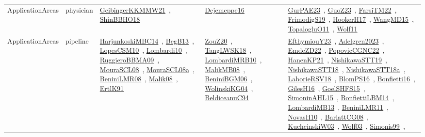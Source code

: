 {\begin{longtable}{lp{3cm}>{\raggedright\arraybackslash}p{6cm}>{\raggedright\arraybackslash}p{6cm}>{\raggedright\arraybackslash}p{8cm}}
ApplicationAreas & physician & \href{works/GeibingerKKMMW21.pdf}{GeibingerKKMMW21}~\cite{GeibingerKKMMW21}, \href{works/ShinBBHO18.pdf}{ShinBBHO18}~\cite{ShinBBHO18} & \href{works/Dejemeppe16.pdf}{Dejemeppe16}~\cite{Dejemeppe16} & \href{works/GurPAE23.pdf}{GurPAE23}~\cite{GurPAE23}, \href{works/GuoZ23.pdf}{GuoZ23}~\cite{GuoZ23}, \href{works/FarsiTM22.pdf}{FarsiTM22}~\cite{FarsiTM22}, \href{works/FrimodigS19.pdf}{FrimodigS19}~\cite{FrimodigS19}, \href{works/HookerH17.pdf}{HookerH17}~\cite{HookerH17}, \href{works/WangMD15.pdf}{WangMD15}~\cite{WangMD15}, \href{works/TopalogluO11.pdf}{TopalogluO11}~\cite{TopalogluO11}, \href{works/Wolf11.pdf}{Wolf11}~\cite{Wolf11}\\
ApplicationAreas & pipeline & \href{works/HarjunkoskiMBC14.pdf}{HarjunkoskiMBC14}~\cite{HarjunkoskiMBC14}, \href{works/BegB13.pdf}{BegB13}~\cite{BegB13}, \href{works/LopesCSM10.pdf}{LopesCSM10}~\cite{LopesCSM10}, \href{works/Lombardi10.pdf}{Lombardi10}~\cite{Lombardi10}, \href{works/RuggieroBBMA09.pdf}{RuggieroBBMA09}~\cite{RuggieroBBMA09}, \href{works/MouraSCL08.pdf}{MouraSCL08}~\cite{MouraSCL08}, \href{works/MouraSCL08a.pdf}{MouraSCL08a}~\cite{MouraSCL08a}, \href{works/BeniniLMR08.pdf}{BeniniLMR08}~\cite{BeniniLMR08}, \href{works/Malik08.pdf}{Malik08}~\cite{Malik08}, \href{works/ErtlK91.pdf}{ErtlK91}~\cite{ErtlK91} & \href{works/ZouZ20.pdf}{ZouZ20}~\cite{ZouZ20}, \href{works/TangLWSK18.pdf}{TangLWSK18}~\cite{TangLWSK18}, \href{works/LombardiMRB10.pdf}{LombardiMRB10}~\cite{LombardiMRB10}, \href{works/MalikMB08.pdf}{MalikMB08}~\cite{MalikMB08}, \href{works/BeniniBGM06.pdf}{BeniniBGM06}~\cite{BeniniBGM06}, \href{works/WolinskiKG04.pdf}{WolinskiKG04}~\cite{WolinskiKG04}, \href{works/BeldiceanuC94.pdf}{BeldiceanuC94}~\cite{BeldiceanuC94} & \href{works/EfthymiouY23.pdf}{EfthymiouY23}~\cite{EfthymiouY23}, \href{works/Adelgren2023.pdf}{Adelgren2023}~\cite{Adelgren2023}, \href{works/EmdeZD22.pdf}{EmdeZD22}~\cite{EmdeZD22}, \href{works/PopovicCGNC22.pdf}{PopovicCGNC22}~\cite{PopovicCGNC22}, \href{works/HanenKP21.pdf}{HanenKP21}~\cite{HanenKP21}, \href{works/NishikawaSTT19.pdf}{NishikawaSTT19}~\cite{NishikawaSTT19}, \href{works/NishikawaSTT18.pdf}{NishikawaSTT18}~\cite{NishikawaSTT18}, \href{works/NishikawaSTT18a.pdf}{NishikawaSTT18a}~\cite{NishikawaSTT18a}, \href{works/LaborieRSV18.pdf}{LaborieRSV18}~\cite{LaborieRSV18}, \href{works/BlomPS16.pdf}{BlomPS16}~\cite{BlomPS16}, \href{works/Bonfietti16.pdf}{Bonfietti16}~\cite{Bonfietti16}, \href{works/GilesH16.pdf}{GilesH16}~\cite{GilesH16}, \href{works/GoelSHFS15.pdf}{GoelSHFS15}~\cite{GoelSHFS15}, \href{works/SimoninAHL15.pdf}{SimoninAHL15}~\cite{SimoninAHL15}, \href{works/BonfiettiLBM14.pdf}{BonfiettiLBM14}~\cite{BonfiettiLBM14}, \href{works/LombardiMB13.pdf}{LombardiMB13}~\cite{LombardiMB13}, \href{works/BeniniLMR11.pdf}{BeniniLMR11}~\cite{BeniniLMR11}, \href{works/NovasH10.pdf}{NovasH10}~\cite{NovasH10}, \href{works/BarlattCG08.pdf}{BarlattCG08}~\cite{BarlattCG08}, \href{works/KuchcinskiW03.pdf}{KuchcinskiW03}~\cite{KuchcinskiW03}, \href{works/Wolf03.pdf}{Wolf03}~\cite{Wolf03}, \href{works/Simonis99.pdf}{Simonis99}~\cite{Simonis99}, 
\end{longtable}}
